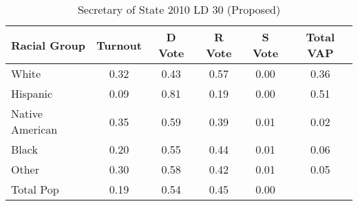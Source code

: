 \begin{table}[htb]
\begin{center}
\caption{Secretary of State 2010 LD 30 (Proposed)}
\label{sos10_vap_ld_30}
\begin{tabular}{lccccc}
  \hline
Racial Group & Turnout & D Vote & R Vote & S Vote & Total VAP \\ 
  \hline
White & 0.32 & 0.43 & 0.57 & 0.00 & 0.36 \\ 
  Hispanic & 0.09 & 0.81 & 0.19 & 0.00 & 0.51 \\ 
  Native American & 0.35 & 0.59 & 0.39 & 0.01 & 0.02 \\ 
  Black & 0.20 & 0.55 & 0.44 & 0.01 & 0.06 \\ 
  Other & 0.30 & 0.58 & 0.42 & 0.01 & 0.05 \\ 
  Total Pop & 0.19 & 0.54 & 0.45 & 0.00 &  \\ 
   \hline
\end{tabular}
\end{center}
\end{table}
